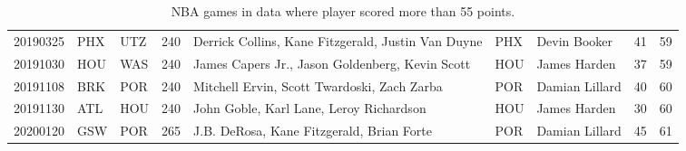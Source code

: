 \begin{table}[ht]
\begin{tabular}{rllrlllrr}
  20190325 & PHX & UTZ & 240 & Derrick Collins, Kane Fitzgerald, Justin Van Duyne & PHX & Devin Booker &  41 &  59 \\ 
  20191030 & HOU & WAS & 240 & James Capers Jr., Jason Goldenberg, Kevin Scott & HOU & James Harden &  37 &  59 \\ 
  20191108 & BRK & POR & 240 & Mitchell Ervin, Scott Twardoski, Zach Zarba & POR & Damian Lillard &  40 &  60 \\ 
  20191130 & ATL & HOU & 240 & John Goble, Karl Lane, Leroy Richardson & HOU & James Harden &  30 &  60 \\ 
  20200120 & GSW & POR & 265 & J.B. DeRosa, Kane Fitzgerald, Brian Forte & POR & Damian Lillard &  45 &  61 \\ 
   \hline
\end{tabular}
\caption{NBA games in data where player scored more than 55 points.} 
\label{tabbig}
\end{table}
